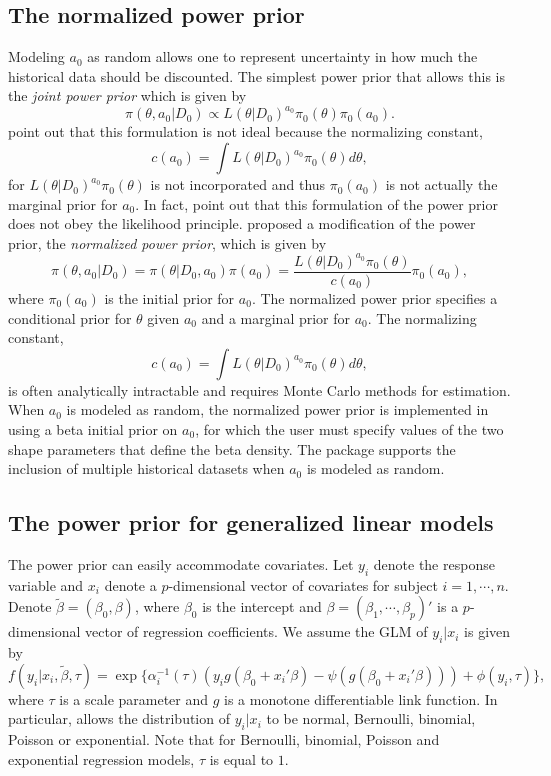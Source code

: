 \subsection*{The normalized power prior}

Modeling $a_0$ as random allows one to represent uncertainty in how much the historical data should be discounted. The simplest power prior that allows this is the \emph{joint power prior} \citep{chen_2000} which is given by $$\pi(\theta, a_0|D_0) \propto L(\theta|D_0)^{a_0}\pi_0(\theta)\pi_0(a_0).$$ \cite{neuens_2009} point out that this formulation is not ideal because the normalizing constant, $$c(a_0)=\int L(\theta|D_0)^{a_0}\pi_0(\theta) d\theta,$$ for $L(\theta|D_0)^{a_0}\pi_0(\theta)$ is not incorporated and thus $\pi_0(a_0)$ is not actually the marginal prior for $a_0$. In fact, \cite{duan_2006} point out that this formulation of the power prior does not obey the likelihood principle. \cite{duan_2006} proposed a modification of the power prior, the \emph{normalized power prior}, which is given by $$\pi(\theta, a_0|D_0) = \pi(\theta|D_0, a_0)\pi(a_0) = \frac{L(\theta|D_0)^{a_0}\pi_0(\theta)}{c(a_0)}\pi_0(a_0),$$ where $\pi_0(a_0)$ is the initial prior for $a_0$. The normalized power prior specifies a conditional prior for $\theta$ given $a_0$ and a marginal prior for $a_0$. The normalizing constant, $$c(a_0)=\int L(\theta|D_0)^{a_0}\pi_0(\theta) d\theta,$$ is often analytically intractable and requires Monte Carlo methods for estimation. When $a_0$ is modeled as random, the normalized power prior is implemented in  using a beta initial prior on $a_0$, for which the user must specify values of the two shape parameters that define the beta density. The package supports the inclusion of multiple historical datasets when $a_0$ is modeled as random. 

\subsection*{The power prior for generalized linear models}

The power prior can easily accommodate covariates. Let $y_i$ denote the response variable and $x_i$ denote a $p$-dimensional vector of covariates for subject $i=1, \cdots, n$. Denote $\tilde{\beta}=(\beta_0, \beta)$, where $\beta_0$ is the intercept and $\beta = (\beta_1, \cdots, \beta_p)'$ is a $p$-dimensional vector of regression coefficients. We assume the GLM of $y_i|x_i$ is given by $$f(y_i|x_i, \tilde{\beta}, \tau) = \exp\{\alpha_i^{-1}(\tau)(y_ig(\beta_0+x_i'\beta)-\psi(g(\beta_0+x_i'\beta))) + \phi(y_i, \tau)\}, $$ where $\tau$ is a scale parameter and $g$ is a monotone differentiable link function. In particular,  allows the distribution of $y_i|x_i$ to be normal, Bernoulli, binomial, Poisson or exponential. Note that for Bernoulli, binomial, Poisson and exponential regression models, $\tau$ is equal to $1$. 

